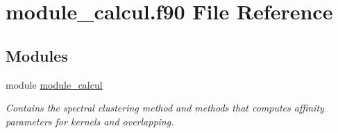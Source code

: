 \hypertarget{module__calcul_8f90}{}\section{module\+\_\+calcul.\+f90 File Reference}
\label{module__calcul_8f90}
\subsection*{Modules}
\begin{DoxyCompactItemize}
\item 
module \hyperlink{namespacemodule__calcul}{module\+\_\+calcul}
\begin{DoxyCompactList}\small\item\em Contains the spectral clustering method and methods that computes affinity parameters for kernels and overlapping. \end{DoxyCompactList}\end{DoxyCompactItemize}
